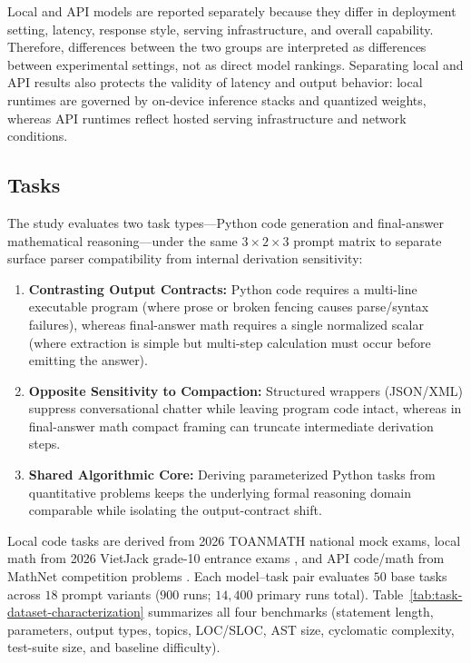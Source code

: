 \documentclass[a4paper,fleqn]{cas-sc}
\providecommand{\tightlist}{%
  \setlength{\itemsep}{0pt}\setlength{\parskip}{0pt}}
\begin{document}
Local and API models are reported separately because they differ in deployment setting, latency, response style, serving infrastructure, and overall capability. Therefore, differences between the two groups are interpreted as differences between experimental settings, not as direct model rankings. Separating local and API results also protects the validity of latency and output behavior: local runtimes are governed by on-device inference stacks and quantized weights, whereas API runtimes reflect hosted serving infrastructure and network conditions.

\subsection{Tasks}\label{tasks}

The study evaluates two task types—Python code generation and final-answer mathematical reasoning—under the same $3 \times 2 \times 3$ prompt matrix to separate surface parser compatibility from internal derivation sensitivity:
\begin{enumerate}
\tightlist
\item \textbf{Contrasting Output Contracts:} Python code requires a multi-line executable program (where prose or broken fencing causes parse/syntax failures), whereas final-answer math requires a single normalized scalar (where extraction is simple but multi-step calculation must occur before emitting the answer).
\item \textbf{Opposite Sensitivity to Compaction:} Structured wrappers (JSON/XML) suppress conversational chatter while leaving program code intact, whereas in final-answer math compact framing can truncate intermediate derivation steps.
\item \textbf{Shared Algorithmic Core:} Deriving parameterized Python tasks from quantitative problems keeps the underlying formal reasoning domain comparable while isolating the output-contract shift.
\end{enumerate}

Local code tasks are derived from 2026 TOANMATH national mock exams, local math from 2026 VietJack grade-10 entrance exams \citep{toanmath2026thpt, vietjack2026onvao10}, and API code/math from MathNet competition problems \citep{huynh2026promptframingrepository}. Each model--task pair evaluates $50$ base tasks across $18$ prompt variants ($900$ runs; $14{,}400$ primary runs total). Table~\ref{tab:task-dataset-characterization} summarizes all four benchmarks (statement length, parameters, output types, topics, LOC/SLOC, AST size, cyclomatic complexity, test-suite size, and baseline difficulty).
\end{document}
